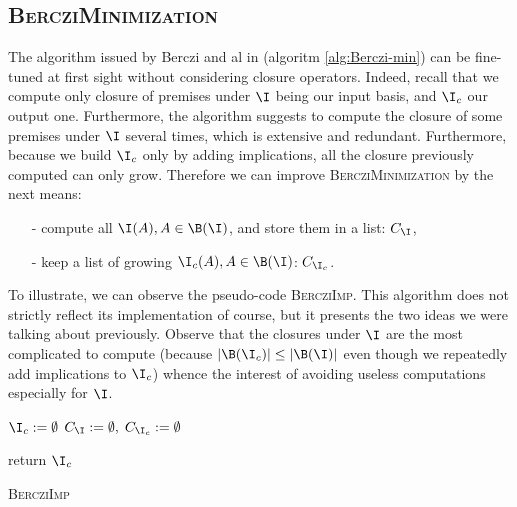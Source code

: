 \subsection{\textsc{BercziMinimization}}

The algorithm issued by Berczi and al in \cite{berczi_directed_2017} (algoritm \ref{alg:Berczi-min}) can be fine-tuned at first sight without considering closure operators. Indeed, recall that we compute only closure of premises under
$\I$ being our input basis, and $\I_c$ our output one. Furthermore, the algorithm suggests to compute the closure of some premises under $\I$ several 
times, which is extensive and redundant. Furthermore, because we build $\I_c$ only by adding implications, all the closure previously computed can only grow.
Therefore we can improve \textsc{BercziMinimization} by the next means:
\begin{itemize}
	\item[-] compute all $\I(A), A \in \B(\I)$, and store them in a list: $C_{\I}$,
	\item[-] keep a list of growing $\I_c(A), A \in \B(\I)$: $C_{\I_c}$.
\end{itemize}
\noindent To illustrate, we can observe the pseudo-code \textsc{BercziImp}. This algorithm does not strictly reflect its implementation of course, but it
presents the two ideas we were talking about previously. Observe that the closures under $\I$ are the most complicated to compute (because $|\B(\I_c)| \leq |\B(\I)|$ even though we repeatedly add implications to $\I_c$) whence
the interest of avoiding useless computations especially for $\I$.

\begin{algorithm}
	
	\BlankLine
	\BlankLine
	
	$\I_c := \emptyset$ \;
	$C_{\I} := \emptyset, \; C_{\I_c} := \emptyset $ \;
	

	\BlankLine
	

	\BlankLine
	
	return $\I_c$ \;
	
	\caption{\textsc{BercziImp}}
	\label{alg:Berczi-imp}
\end{algorithm}

